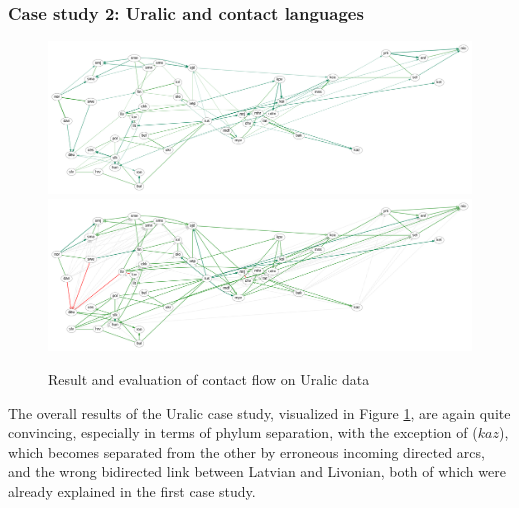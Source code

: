  \largerpage
 \subsubsection{Case study 2: Uralic and contact languages}
 \begin{figure}
 \includegraphics[width=\textwidth]{figures/uralic-contact-fs-tss.pdf}
 \vspace*{5mm}
 \includegraphics[width=\textwidth]{figures/uralic-contact-fs-tss-eval.pdf}
 \caption{Result and evaluation of contact flow on Uralic data}
 \label{uralic-result-contact}
 \end{figure}
 
The overall results of the Uralic case study, visualized in Figure \ref{uralic-result-contact}, are again quite convincing, especially in terms of phylum separation, with the exception of  ($kaz$), which becomes separated from the other  by erroneous incoming directed arcs, and the wrong bidirected link between Latvian and Livonian, both of which were already explained in the first case study.
 
